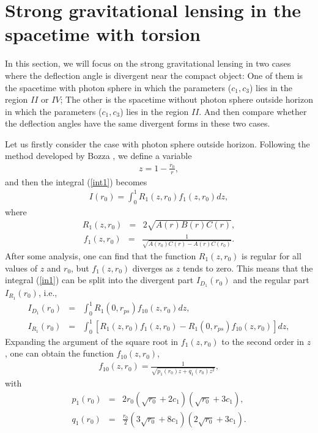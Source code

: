 \documentclass[aps,showpacs,preprintnumbers,amsmath,amssymb]{revtex4}
\begin{document}
\section{Strong gravitational lensing in the spacetime with torsion}

In this section, we will focus on the strong gravitational lensing in two cases where the deflection angle is divergent near the compact object: One of them is the spacetime with photon sphere in which the parameters ($c_1, c_3$) lies in the region $II$ or $IV$; The other is the spacetime without photon sphere outside horizon in which the parameters ($c_1, c_3$) lies in the region $II$. And then compare whether the deflection angles have the same divergent forms in these two cases.

Let us firstly consider the case with photon sphere outside horizon.
Following the method developed by Bozza
\cite{VB1}, we define a variable
\begin{eqnarray}
z=1-\frac{r_0}{r},
\end{eqnarray}
and then the integral (\ref{int1}) becomes
\begin{eqnarray}
I(r_0)=\int^{1}_{0}R_1(z,r_0)f_1(z,r_0)dz,\label{in1}
\end{eqnarray}
where
\begin{eqnarray}
R_1(z,r_0)&=&2\sqrt{A(r)B(r)C(r)},
\end{eqnarray}
\begin{eqnarray}
f_1(z,r_0)&=&\frac{1}{\sqrt{A(r_0)C(r)-A(r)C(r_0)}}.
\end{eqnarray}
After some analysis, one can find that the function $R_1(z, r_0)$ is regular for all values of $z$ and $r_0$, but $f_1(z, r_0)$ diverges as $z$ tends to zero. This means that
the integral (\ref{in1}) can be split into the divergent part $I_{D_1}(r_0)$ and the regular
part $I_{R_1}(r_0)$, i.e.,
\begin{eqnarray}
I_{D_1}(r_0)&=&\int^{1}_{0}R_{1}(0,r_{ps})f_{10}(z,r_0)dz, \nonumber\\
I_{R_1}(r_0)&=&\int^{1}_{0}[R_1(z,r_0)f_1(z,r_0)-R_1(0,r_{ps})f_{10}(z,r_0)]dz
\label{intbr},
\end{eqnarray}
Expanding the argument of the square
root in $f_1(z,r_0)$ to the second order in $z$, one can obtain the
function $f_{10}(z,r_0)$,
\begin{eqnarray}
f_{10}(z,r_0)=\frac{1}{\sqrt{p_1(r_0)z+q_1(r_0)z^2}},
\end{eqnarray}
with
\begin{eqnarray}
p_1(r_0)&=& 2r_0(\sqrt{r_0}+2c_1)(\sqrt{r_0}+3c_1),  \nonumber\\
q_1(r_0)&=&\frac{r_0}{2}(3\sqrt{r_0}+8c_1)(2\sqrt{r_0}+3c_1).
\end{eqnarray}
\end{document}
